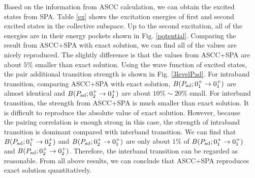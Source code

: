 \documentclass[%
superscriptaddress,
showpacs,
nofootinbib,
amsmath,amssymb,
aps,
prc,
twocolumn,
floatfix ]%
{revtex4-1}
\begin{document}
Based on the information from ASCC calculation, we can obtain the excited states from SPA.
Table \ref{ex} shows the excitation energies of first and second excited states in the collective subspace. Up to the second excitation, all of the energies are in their energy pockets shown in Fig. \ref{potential}. Comparing the result from ASCC+SPA with exact solution, we can find all of the values are nicely reproduced. The slightly difference is that the values from ASCC+SPA are about $5\%$ smaller than exact solution. 
Using the wave function of excited states, the pair additional transition strength is shown in Fig. \ref{3levelPad}. For intraband transition, comparing ASCC+SPA with exact solution, $B(P_{\rm ad};0_1^+\rightarrow 0_1^+)$ are almost identical and $B(P_{\rm ad};0_2^+\rightarrow 0_2^+)$ are about $10\%\sim20\%$ small. 
For interband transition, the strength from ASCC+SPA is much smaller than exact solution. It is difficult to reproduce the absolute value of exact solution. However, because the pairing correlation is enough strong in this case, the strength of intraband transition is dominant compared with interband transition. We can find that $B(P_{\rm ad};0_1^+\rightarrow 0_2^+)$ and $B(P_{\rm ad};0_2^+\rightarrow 0_1^+)$ are only about $1\%$ of $B(P_{\rm ad};0_1^+\rightarrow 0_1^+)$ and $B(P_{\rm ad};0_2^+\rightarrow 0_2^+)$. Therefore, the interband transition can be regarded as reasonable. From all above results, we can conclude that ASCC+SPA reproduces exact solution quantitatively. 
\end{document}
